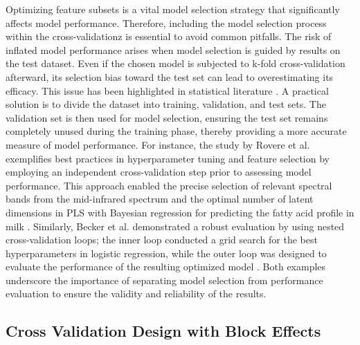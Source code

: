 Optimizing feature subsets is a vital model selection strategy that significantly affects model performance. Therefore, including the model selection process within the cross-validationz is essential to avoid common pitfalls. The risk of inflated model performance arises when model selection is guided by results on the test dataset. Even if the chosen model is subjected to k-fold cross-validation afterward, its selection bias toward the test set can lead to overestimating its efficacy. This issue has been highlighted in statistical literature \citep{hastie_elements_2009}. A practical solution is to divide the dataset into training, validation, and test sets. The validation set is then used for model selection, ensuring the test set remains completely unused during the training phase, thereby providing a more accurate measure of model performance. For instance, the study by Rovere et al. exemplifies best practices in hyperparameter tuning and feature selection by employing an independent cross-validation step prior to assessing model performance. This approach enabled the precise selection of relevant spectral bands from the mid-infrared spectrum and the optimal number of latent dimensions in PLS with Bayesian regression for predicting the fatty acid profile in milk \citep{rovere_prediction_2021}. Similarly, Becker et al. demonstrated a robust evaluation by using nested cross-validation loops; the inner loop conducted a grid search for the best hyperparameters in logistic regression, while the outer loop was designed to evaluate the performance of the resulting optimized model \citep{becker_predicting_2021}. Both examples underscore the importance of separating model selection from performance evaluation to ensure the validity and reliability of the results.

\subsection{Cross Validation Design with Block Effects}

